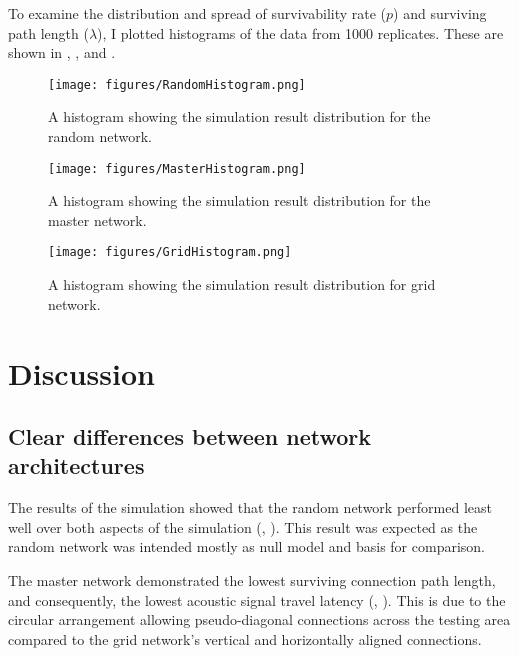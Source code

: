 \documentclass[twocolumn,10pt]{IEEEtran}
\begin{document}
To examine the distribution and spread of survivability rate ($p$) and surviving path length ($\lambda$), I plotted histograms of the data from 1000 replicates. These are shown in , , and .  
\begin{figure}[h]
\begin{center}
\texttt{[image: figures/RandomHistogram.png]}
\end{center}
\caption{A histogram showing the simulation result distribution for the random network.}
\label{fig:historandom}
\end{figure}
\begin{figure}[h]
\begin{center}
\texttt{[image: figures/MasterHistogram.png]}
\end{center}
\caption{A histogram showing the simulation result distribution for the master network.}
\label{fig:histomaster}
\end{figure}
\begin{figure}[h]
\begin{center}
\texttt{[image: figures/GridHistogram.png]}
\end{center}
\caption{A histogram showing the simulation result distribution for grid network.}
\label{fig:histogrid}
\end{figure}

\section{Discussion}
\subsection{Clear differences between network architectures}
The results of the simulation showed that the random network performed least well over both aspects of the simulation (, ). This result was expected as the random network was intended mostly as null model and basis for comparison. 

The master network demonstrated the lowest surviving connection path length, and consequently, the lowest acoustic signal travel latency (, ).  This is due to the circular arrangement allowing pseudo-diagonal connections across the testing area compared to the grid network’s vertical and horizontally aligned connections. 
\end{document}
